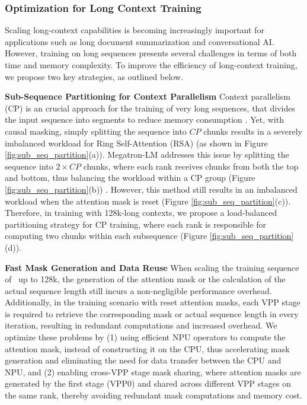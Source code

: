 \subsubsection{Optimization for Long Context Training}
Scaling long-context capabilities is becoming increasingly important for applications such as long document summarization and conversational AI.
However, training on long sequences presents several challenges in terms of both time and memory complexity.
To improve the efficiency of long-context training, we propose two key strategies, as outlined below.

\textbf{Sub-Sequence Partitioning for Context Parallelism} 
Context parallelism (CP) is an crucial approach for the training of very long sequences, that divides the input sequence into segments to reduce memory consumption \cite{ringattention, ulysses}.
Yet, with causal masking, simply splitting the sequence into $CP$ chunks results in a severely imbalanced workload for Ring Self-Attention (RSA) \cite{ringattention} (as shown in Figure \ref{fig:sub_seq_partition}(a)).
Megatron-LM addresses this issue by splitting the sequence into $2\times CP$ chunks, where each rank receives chunks from both the top and bottom, thus balancing the workload within a CP group (Figure \ref{fig:sub_seq_partition}(b)) \cite{megatron-github}.
However, this method still results in an imbalanced workload when the attention mask is reset (Figure \ref{fig:sub_seq_partition}(c)).
Therefore, in training with 128k-long contexts, we propose a load-balanced partitioning strategy for CP training, where each rank is responsible for computing two chunks within each subsequence (Figure \ref{fig:sub_seq_partition}(d)).

\textbf{Fast Mask Generation and Data Reuse}
When scaling the training sequence of \modelname~up to 128k, the generation of the attention mask or the calculation of the actual sequence length still incurs a non-negligible performance overhead.
Additionally, in the training scenario with reset attention masks, each VPP stage is required to retrieve the corresponding mask or actual sequence length in every iteration, resulting in redundant computations and increased overhead.
We optimize these problems by (1) using efficient NPU operators to compute the attention mask, instead of constructing it on the CPU, thus accelerating mask generation and eliminating the need for data transfer between the CPU and NPU, and (2) enabling cross-VPP stage mask sharing, where attention masks are generated by the first stage (VPP0) and shared across different VPP stages on the same rank, thereby avoiding redundant mask computations and memory cost.